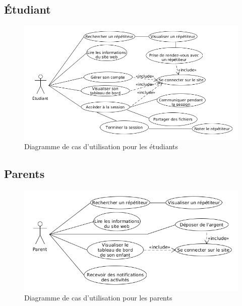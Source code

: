 \documentclass[a4paper]{scrreprt}
\begin{document}
\subsection{Étudiant}
\begin{figure}[H]
  \centering
  \includegraphics[width=\textwidth]{img/UseCase_Etudiant.png}
  \caption{Diagramme de cas d'utilisation pour les étudiants}
  \label{fig:uc_etudiant}
\end{figure}

\subsection{Parents}
\begin{figure}[H]
  \centering
  \includegraphics[width=\textwidth]{img/UseCase_Parent.png}
  \caption{Diagramme de cas d'utilisation pour les parents}
  \label{fig:uc_parent}
\end{figure}
\end{document}
